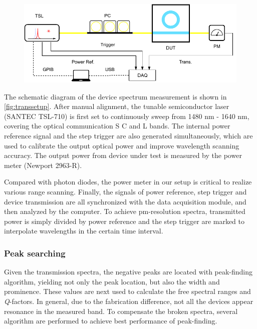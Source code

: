 \begin{figure}
	\centering
	\includegraphics[width=1\textwidth]{imgs/trans.pdf}
	\label{fig:transsetup}
\end{figure}

The schematic diagram of the device spectrum measurement is shown in \autoref{fig:transsetup}. 
After manual alignment, the tunable semiconductor laser (SANTEC TSL-710) is first set to continuously sweep from 1480 nm - 1640 nm, covering the optical communication S C and L bands.
The internal power reference signal and the step trigger are also generated simultaneously, which are used to calibrate the output optical power and improve wavelength scanning accuracy. The output power from device under test is measured by the power meter (Newport 2963-R). 

Compared with photon diodes, the power meter in our setup is critical to realize various range scanning.  Finally, the signals of power reference, step trigger and device transmission are all synchronized with the data acquisition module, and then analyzed by the computer. To achieve pm-resolution spectra, transmitted power is simply divided by power reference and the step trigger are marked to interpolate wavelengths in the certain time interval.

\subsubsection{Peak searching}

Given the transmission spectra, the negative peaks are located with peak-finding algorithm, yielding not only the peak location, but also the width and prominence. These values are next used to calculate the free spectral ranges and \textit{Q}-factors. In general, due to the fabrication difference, not all the devices appear resonance in the measured band. To compensate the broken spectra, several algorithm are performed to achieve best performance of peak-finding. 

